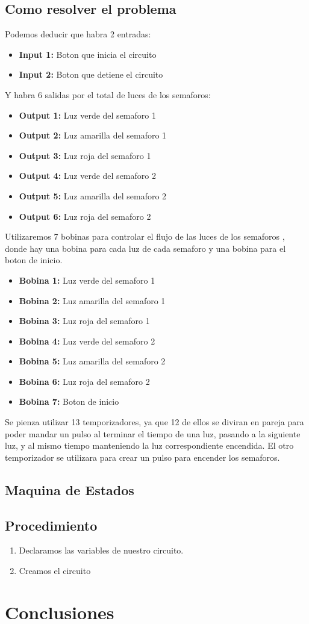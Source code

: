 \documentclass[12pt]{report}
\begin{document}
\section{Como resolver el problema}
  Podemos deducir que habra 2 entradas:
  \begin{itemize}
    \item \textbf{Input 1:} Boton que inicia el circuito
    \item \textbf{Input 2:} Boton que detiene el circuito
  \end{itemize}
  Y habra 6 salidas por el total de luces de los semaforos:
  \begin{itemize}
    \item \textbf{Output 1:} Luz verde del semaforo 1
    \item \textbf{Output 2:} Luz amarilla del semaforo 1
    \item \textbf{Output 3:} Luz roja del semaforo 1
    \item \textbf{Output 4:} Luz verde del semaforo 2
    \item \textbf{Output 5:} Luz amarilla del semaforo 2
    \item \textbf{Output 6:} Luz roja del semaforo 2
  \end{itemize}
  Utilizaremos 7 bobinas para controlar el flujo de las luces de los semaforos , donde hay una bobina para cada luz de cada semaforo y una bobina para el boton de inicio.
  \begin{itemize}
    \item \textbf{Bobina 1:} Luz verde del semaforo 1
    \item \textbf{Bobina 2:} Luz amarilla del semaforo 1
    \item \textbf{Bobina 3:} Luz roja del semaforo 1
    \item \textbf{Bobina 4:} Luz verde del semaforo 2
    \item \textbf{Bobina 5:} Luz amarilla del semaforo 2
    \item \textbf{Bobina 6:} Luz roja del semaforo 2
    \item \textbf{Bobina 7:} Boton de inicio
  \end{itemize}
  Se pienza utilizar 13 temporizadores, ya que 12 de ellos se diviran en pareja para poder mandar un pulso al terminar el tiempo de una luz, pasando a la siguiente luz, y al mismo tiempo manteniendo la luz correspondiente encendida.
  El otro temporizador se utilizara para crear un pulso para encender los semaforos.
\section{Maquina de Estados}


\section{Procedimiento}
\begin{enumerate}
  \item Declaramos las variables de nuestro circuito.
  \item Creamos el circuito

\end{enumerate}

\newpage

\chapter{Conclusiones}
\newpage
\end{document}
